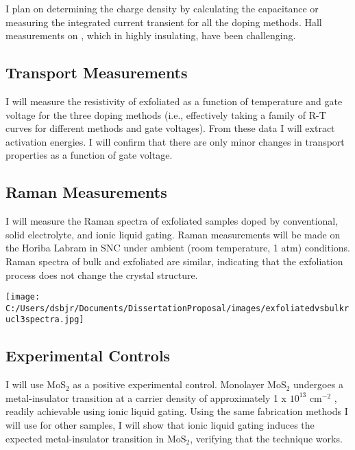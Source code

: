 \documentclass[11pt]{article}
\newenvironment{Figure}
  {\par\medskip\noindent\minipage{\linewidth}}
  {\endminipage\par\medskip}
\begin{document}
\begin{multicols}{2}
I plan on determining the charge density by calculating the capacitance or measuring the integrated current transient for all the doping methods. Hall measurements on \ruclnospace, which in highly insulating, have been challenging.

\subsection{Transport Measurements}

I will measure the resistivity of exfoliated \rucl as a function of temperature and gate voltage for the three doping methods (i.e., effectively taking a family of R-T curves for different methods and gate voltages). From these data I will extract activation energies. I will confirm that there are only minor changes in transport properties as a function of gate voltage.

\subsection{Raman Measurements}

I will measure the Raman spectra of exfoliated \rucl samples doped by conventional, solid electrolyte, and ionic liquid gating. Raman measurements will be made on the Horiba Labram in SNC under ambient (room temperature, 1 atm) conditions. Raman spectra of bulk and exfoliated \rucl are similar, indicating that the exfoliation process does not change the crystal structure.

\begin{Figure}
		{\texttt{[image: C:/Users/dsbjr/Documents/DissertationProposal/images/exfoliatedvsbulkrucl3spectra.jpg]}\label{fig:f4}}
\end{Figure}

\subsection{Experimental Controls}

I will use MoS$_{2}$ as a positive experimental control. Monolayer MoS$_{2}$ undergoes a metal-insulator transition at a carrier density of approximately 1 x $10^{13}$ cm$^{-2}$ \cite{Radisavljevic2013}, readily achievable using ionic liquid gating. Using the same fabrication methods I will use for other samples, I will show that ionic liquid gating induces the expected metal-insulator transition in MoS$_{2}$, verifying that the technique works.


\end{multicols}
\end{document}
